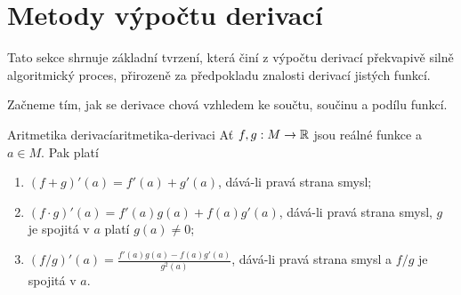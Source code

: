 \section{Metody výpočtu derivací}
\label{sec:metody-vypoctu-derivaci}

Tato sekce shrnuje základní tvrzení, která činí z výpočtu derivací překvapivě
silně algoritmický proces, přirozeně za předpokladu znalosti derivací jistých
 funkcí.

Začneme tím, jak se derivace chová vzhledem ke součtu, součinu a podílu funkcí.

\begin{theorem}{Aritmetika derivací}{aritmetika-derivaci}
 Ať $f,g:M \to \mathbb{R}$ jsou reálné funkce a $a \in M$. Pak platí
 \begin{enumerate}
  \item $(f + g)'(a) = f'(a) + g'(a)$, dává-li pravá strana smysl;
  \item $(f \cdot g)'(a) = f'(a)g(a) + f(a)g'(a)$, dává-li pravá strana smysl,
   $g$ je spojitá v $a$ platí $g(a) \neq 0$;
  \item $(f / g)'(a) = \frac{f'(a)g(a) - f(a)g'(a)}{g^2(a)}$, dává-li pravá
   strana smysl a $f / g$ je spojitá v $a$.
 \end{enumerate}
\end{theorem}
